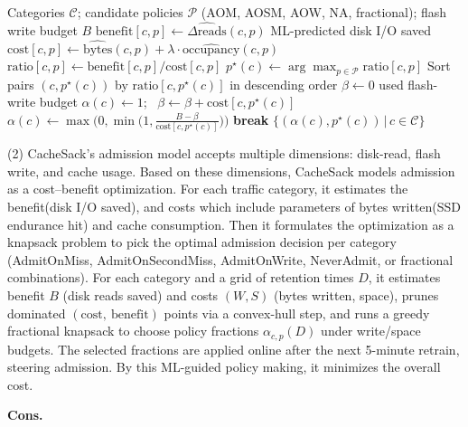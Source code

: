 \begin{algorithm}[H]
\caption{Bucket B: Category-level ML-guided admission selection (CacheSack)}
\label{alg:cachesack}
\begin{algorithmic}[1]
\Require Categories $\mathcal{C}$; candidate policies $\mathcal{P}$ (AOM, AOSM, AOW, NA, fractional); flash write budget $B$
    \State $\text{benefit}[c,p] \gets \widehat{\Delta \text{reads}}(c,p)$ \Comment ML-predicted disk I/O saved
    \State $\text{cost}[c,p] \gets \widehat{\text{bytes}}(c,p) + \lambda \cdot \widehat{\text{occupancy}}(c,p)$
    \State $\text{ratio}[c,p] \gets \text{benefit}[c,p]/\text{cost}[c,p]$
  \EndFor
  \State $p^\star(c) \gets \arg\max_{p \in \mathcal{P}} \text{ratio}[c,p]$
\EndFor
\State Sort pairs $(c,p^\star(c))$ by $\text{ratio}[c,p^\star(c)]$ in descending order
\State $\beta \gets 0$ \Comment used flash-write budget
    \State $\alpha(c) \gets 1$; \ $\beta \gets \beta + \text{cost}[c,p^\star(c)]$
  \Else
    \State $\alpha(c) \gets \max\!\bigl(0, \min\!\bigl(1,\frac{B-\beta}{\text{cost}[c,p^\star(c)]}\bigr)\bigr)$
    \State \textbf{break}
  \EndIf
\EndFor
\State \Return $\{(\alpha(c), p^\star(c)) \,|\, c \in \mathcal{C}\}$
\end{algorithmic}
\end{algorithm}
\noindent
(2) CacheSack’s admission model accepts multiple dimensions:
disk-read, flash write, and cache usage. Based on these dimensions,
CacheSack models admission as a cost–benefit optimization. For
each traffic category, it estimates the benefit(disk I/O saved), and
costs which include parameters of bytes written(SSD endurance
hit) and cache consumption. Then it formulates the optimization as a knapsack problem to pick the optimal admission decision per category (AdmitOnMiss, AdmitOnSecondMiss, AdmitOnWrite, NeverAdmit, or fractional combinations). For each category and a grid of retention times $D$, it estimates benefit $B$ (disk reads saved) and costs $(W,S)$ (bytes written, space), prunes dominated $(\text{cost},\ \text{benefit})$ points via a convex-hull step, and runs a greedy fractional knapsack to choose policy fractions $\alpha_{c,p}(D)$ under write/space budgets. The selected fractions are applied online after the next 5-minute retrain, steering admission. By this ML-guided policy
making, it minimizes the overall cost.




\noindent\textbf{Cons.}

